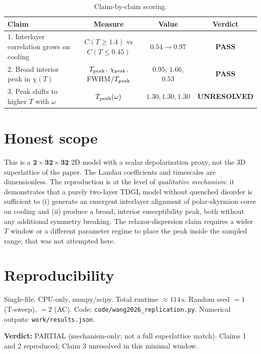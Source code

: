 \documentclass[11pt]{article}
\begin{document}
\begin{table}[htbp]
  \centering
  \begin{tabular}{lccc}
  \toprule
  Claim & Measure & Value & Verdict\\
  \midrule
  1. Interlayer correlation grows on cooling
    & $C(T{\ge}1.4)$ vs $C(T{\le}0.45)$
    & $0.54\!\rightarrow\!0.97$
    & \textbf{PASS}\\
  2. Broad interior peak in $\chi(T)$
    & $T_{\rm peak}$, $\chi_{\rm peak}$, FWHM$/T_{\rm peak}$
    & $0.95$, $1.66$, $0.53$
    & \textbf{PASS}\\
  3. Peak shifts to higher $T$ with $\omega$
    & $T_{\rm peak}(\omega)$
    & $1.30,1.30,1.30$
    & \textbf{UNRESOLVED}\\
  \bottomrule
  \end{tabular}
  \caption{Claim-by-claim scoring.}
\end{table}

\section{Honest scope}
This is a $\mathbf{2\times32\times32}$ 2D model with a scalar depolarization
proxy, not the 3D superlattice of the paper. The Landau coefficients and
timescales are dimensionless. The reproduction is at the level of
\emph{qualitative mechanism}: it demonstrates that a purely two-layer TDGL
model without quenched disorder is sufficient to (i) generate an emergent
interlayer alignment of polar-skyrmion cores on cooling and (ii) produce a
broad, interior susceptibility peak, both without any additional symmetry
breaking. The relaxor-dispersion claim requires a wider $T$ window or a
different parameter regime to place the peak inside the sampled range; that
was not attempted here.

\section{Reproducibility}
Single-file, CPU-only, numpy/scipy. Total runtime $\approx 114\,\mathrm{s}$.
Random seed $=1$ (T-sweep), $=2$ (AC). Code: \verb|code/wang2026_replication.py|.
Numerical outputs: \verb|work/results.json|.

\bigskip\noindent\textbf{Verdict:} PARTIAL (mechanism-only; not a full
superlattice match). Claims 1 and 2 reproduced; Claim 3 unresolved in this
minimal window.
\end{document}
